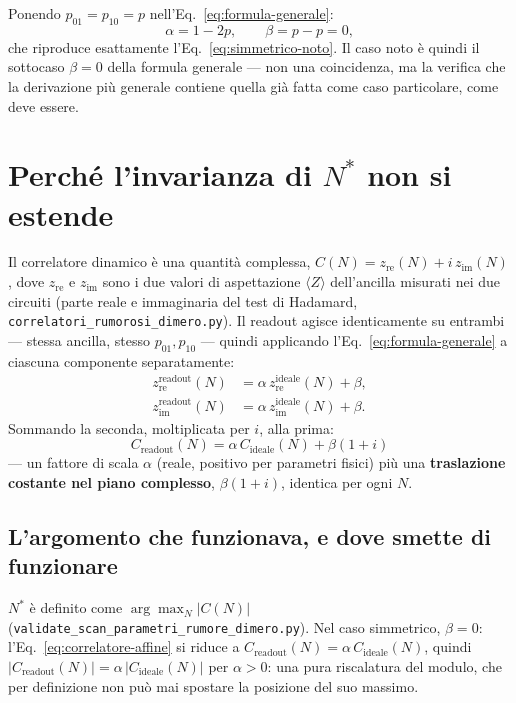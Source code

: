 \documentclass[11pt,a4paper]{article}
\begin{document}
Ponendo $p_{01}=p_{10}=p$ nell'Eq.~\eqref{eq:formula-generale}:
\begin{equation}
\alpha = 1-2p, \qquad \beta = p-p = 0,
\end{equation}
che riproduce esattamente l'Eq.~\eqref{eq:simmetrico-noto}. Il caso noto
è quindi il sottocaso $\beta=0$ della formula generale --- non una
coincidenza, ma la verifica che la derivazione più generale contiene
quella già fatta come caso particolare, come deve essere.

\section{Perché l'invarianza di \texorpdfstring{$N^*$}{N*} non si estende}
\label{sec:rottura-invarianza}

Il correlatore dinamico è una quantità complessa,
$C(N)=z_\text{re}(N)+i\,z_\text{im}(N)$, dove $z_\text{re}$ e
$z_\text{im}$ sono i due valori di aspettazione $\langle Z\rangle$
dell'ancilla misurati nei due circuiti (parte reale e immaginaria del
test di Hadamard, \texttt{correlatori\_rumorosi\_dimero.py}). Il
readout agisce identicamente su entrambi --- stessa ancilla, stesso
$p_{01},p_{10}$ --- quindi applicando l'Eq.~\eqref{eq:formula-generale}
a ciascuna componente separatamente:
\begin{align}
z_\text{re}^\text{readout}(N) &= \alpha\,z_\text{re}^\text{ideale}(N) + \beta, \\
z_\text{im}^\text{readout}(N) &= \alpha\,z_\text{im}^\text{ideale}(N) + \beta.
\end{align}
Sommando la seconda, moltiplicata per $i$, alla prima:
\begin{equation}
\boxed{\;C_\text{readout}(N) = \alpha\,C_\text{ideale}(N) + \beta(1+i)\;}
\label{eq:correlatore-affine}
\end{equation}
--- un fattore di scala $\alpha$ (reale, positivo per parametri fisici)
più una \textbf{traslazione costante nel piano complesso}, $\beta(1+i)$,
identica per ogni $N$.

\subsection{L'argomento che funzionava, e dove smette di funzionare}

$N^*$ è definito come $\arg\max_N|C(N)|$
(\texttt{validate\_scan\_\allowbreak parametri\_rumore\_dimero.py}). Nel caso
simmetrico, $\beta=0$: l'Eq.~\eqref{eq:correlatore-affine} si riduce a
$C_\text{readout}(N)=\alpha\,C_\text{ideale}(N)$, quindi
$|C_\text{readout}(N)|=\alpha\,|C_\text{ideale}(N)|$ per $\alpha>0$: una
pura riscalatura del modulo, che per definizione non può mai spostare la
posizione del suo massimo.
\end{document}
